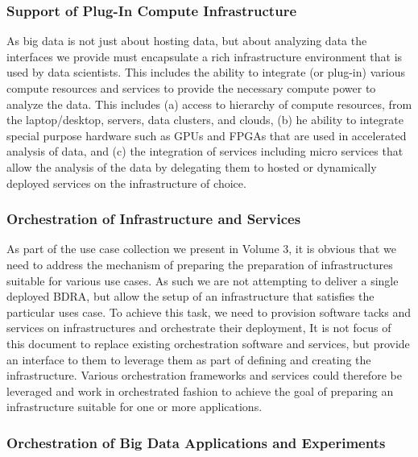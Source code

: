\documentclass[10pt]{article}
\begin{document}
\subsubsection{Support of Plug-In Compute Infrastructure}

As big data is not just about hosting data, but about analyzing data the interfaces we provide must encapsulate a rich infrastructure environment that is used by data scientists. This includes the ability to integrate (or plug-in) various compute resources and services to provide the necessary compute power to analyze the data. This includes (a) access to hierarchy of compute resources, from the laptop/desktop, servers, data clusters, and clouds, (b) he ability to integrate special purpose hardware such as GPUs and FPGAs that are used in accelerated analysis of data, and (c) the integration of services including micro services that allow the analysis of the data by delegating them to hosted or dynamically deployed services on the infrastructure of choice.

\subsubsection{Orchestration of Infrastructure and Services}

As part of the use case collection we present in Volume 3, it is obvious that we need to address the mechanism of preparing the preparation of infrastructures suitable for various use cases. As such we are not attempting to deliver a single deployed BDRA, but allow the setup of an infrastructure that satisfies the particular uses case. To achieve this task, we need to provision software tacks and services on infrastructures and orchestrate their deployment, It is not focus of this document to replace existing orchestration software and services, but provide an interface to them to leverage them as part of defining and creating the infrastructure. Various orchestration frameworks and services could therefore be leveraged and work in orchestrated fashion to achieve the goal of preparing an infrastructure suitable for one or more applications.

\subsubsection{Orchestration of Big Data Applications and Experiments}
\end{document}
